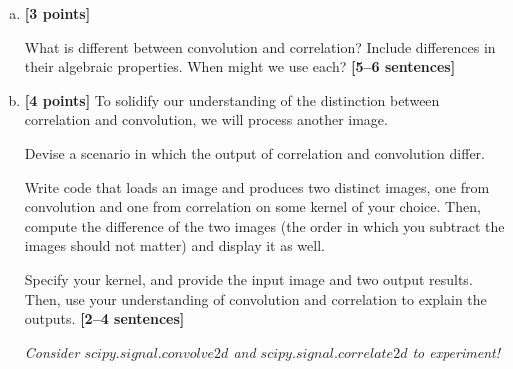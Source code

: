 \documentclass[11pt]{article}
\begin{document}
\begin{enumerate}[(a)]

    \item \textbf{[3 points]} 
    \begin{tcolorbox}[colback=orange!5!white,colframe=orange!75!black]
    What is different between convolution and correlation? Include differences in their algebraic properties. When might we use each? \textbf{[5--6 sentences]}
    \end{tcolorbox}
    
    
    \item \textbf{[4 points]}
    To solidify our understanding of the distinction between correlation and convolution, we will process another image.
    
    \begin{tcolorbox}[colback=orange!5!white,colframe=orange!75!black]
    Devise a scenario in which the output of correlation and convolution differ.
    
    Write code that loads an image and produces two distinct images, one from convolution and one from correlation on some kernel of your choice. Then, compute the difference of the two images (the order in which you subtract the images should not matter) and display it as well.
    
    Specify your kernel, and provide the input image and two output results. Then, use your understanding of convolution and correlation to explain the outputs. \textbf{[2--4 sentences]}
    \end{tcolorbox}
    
    \emph{Consider \href{https://docs.scipy.org/doc/scipy/reference/generated/scipy.signal.convolve2d.html}{$scipy.signal.convolve2d$} and \href{https://docs.scipy.org/doc/scipy/reference/generated/scipy.signal.correlate2d.html}{$scipy.signal.correlate2d$} to experiment!}
    


\end{enumerate}
\end{document}
